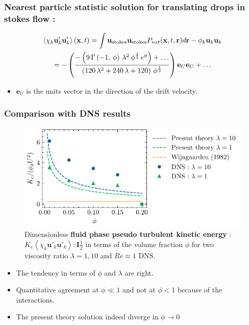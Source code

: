 \documentclass{sintefbeamer}
\newcommand{\avg}[1]{\left<#1\right>}
\begin{document}
\begin{frame}
  \frametitle{Nearest particle statistic solution for translating drops in stokes flow :}
  \begin{multline}
    \avg{\chi_k \textbf{u}'_k\textbf{u}'_k}(\textbf{x},t)
    = 
    {\int \textbf{u}_\text{stokes} \textbf{u}_\text{stokes}  P_{nst}(\textbf{x},t,\textbf{r}) d\textbf{r} }
    - \phi_k \textbf{u}_k\textbf{u}_k
    \\=
-\left({{-\left(9\,\Gamma\left(-1 , \,\phi\right)\,\lambda^2\,\phi
^{{{4}\over{3}}}\,e^{\phi}\right)+\ldots}\over{\left(120\,\lambda^2+240\,\lambda+
120\right)\,\phi^{{{1}\over{3}}}}}\right)
\textbf{e}_U\textbf{e}_U + \ldots
\end{multline}
\begin{itemize}
  \item $\textbf{e}_U$ is the units vector in the direction of the drift velocity. 
\end{itemize}

\end{frame}

\begin{frame}
  \frametitle{Comparison with DNS results }
  \begin{figure}[h!]
    \centering    
    \includegraphics[height = 0.25\textwidth]{image/HOMOGENEOUS/fCA/Pseudo_turbe.pdf}
    \caption{
       Dimensionless \textbf{fluid phase pseudo turbulent kinetic energy} : $K_c \avg{\chi_k \textbf{u}'_k\textbf{u}'_k} : \textbf{I} \frac{1}{2}$ in terms of the volume fraction $\phi$ for two viscosity ratio $\lambda =1,10$ and $Re \approx 1$ DNS. 
    }
    \label{fig:Cp}
\end{figure}  
\begin{itemize}
  \item The tendency in terms of $\phi$ and $\lambda$ are right.  
  \item Quantitative agreement at $\phi \ll 1$ and not at $\phi <1$ because of the interactions.  
  \item The present theory solution indeed diverge in $\phi \to 0$ 
\end{itemize}
\end{frame}
\end{document}

